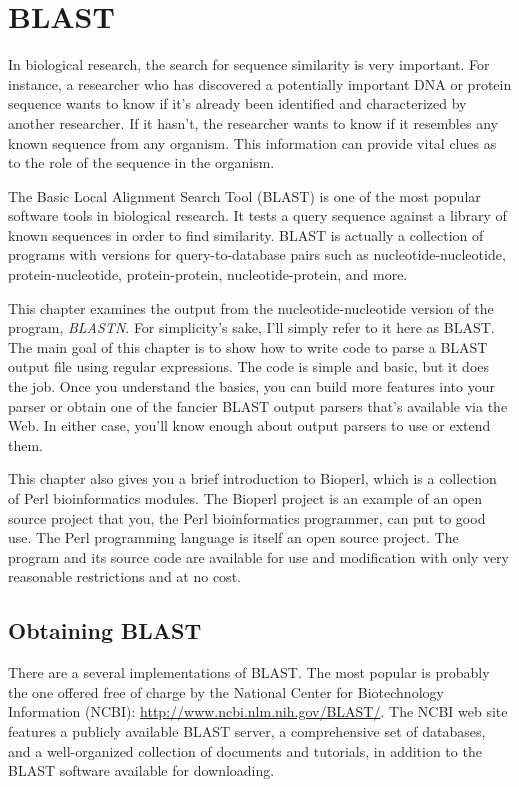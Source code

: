 \chapter{BLAST}
\label{chap:chapter12}
\minitoc

In biological research, the search for sequence similarity is very important. For instance, a researcher who has discovered a potentially important DNA or protein sequence wants to know if it's already been identified and characterized by another researcher. If it hasn't, the researcher wants to know if it resembles any known sequence from any organism. This information can provide vital clues as to the role of the sequence in the organism.

The Basic Local Alignment Search Tool (BLAST) is one of the most popular software tools in biological research. It tests a query sequence against a library of known sequences in order to find similarity. BLAST is actually a collection of programs with versions for query-to-database pairs such as nucleotide-nucleotide, protein-nucleotide, protein-protein, nucleotide-protein, and more.

This chapter examines the output from the nucleotide-nucleotide version of the program, \textit{BLASTN}. For simplicity's sake, I'll simply refer to it here as BLAST. The main goal of this chapter is to show how to write code to parse a BLAST output file using regular expressions. The code is simple and basic, but it does the job. Once you understand the basics, you can build more features into your parser or obtain one of the fancier BLAST output parsers that's available via the Web. In either case, you'll know enough about output parsers to use or extend them.

This chapter also gives you a brief introduction to Bioperl, which is a collection of Perl bioinformatics modules. The Bioperl project is an example of an open source project that you, the Perl bioinformatics programmer, can put to good use. The Perl programming language is itself an open source project. The program and its source code are available for use and modification with only very reasonable restrictions and at no cost.

\section{Obtaining BLAST}
There are a several implementations of BLAST. The most popular is probably the one offered free of charge by the National Center for Biotechnology Information (NCBI): \href{http://www.ncbi.nlm.nih.gov/BLAST/}{http://www.ncbi.nlm.nih.gov/BLAST/}. The NCBI web site features a publicly available BLAST server, a comprehensive set of databases, and a well-organized collection of documents and tutorials, in addition to the BLAST software available for downloading.

